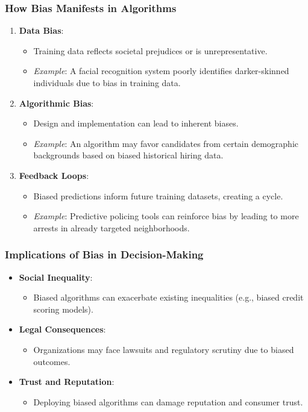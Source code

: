 \documentclass[aspectratio=169]{beamer}
\begin{document}
\begin{frame}[fragile]
    \frametitle{How Bias Manifests in Algorithms}
    \begin{enumerate}
        \item \textbf{Data Bias}:
        \begin{itemize}
            \item Training data reflects societal prejudices or is unrepresentative.
            \item \textit{Example}: A facial recognition system poorly identifies darker-skinned individuals due to bias in training data.
        \end{itemize}

        \item \textbf{Algorithmic Bias}:
        \begin{itemize}
            \item Design and implementation can lead to inherent biases.
            \item \textit{Example}: An algorithm may favor candidates from certain demographic backgrounds based on biased historical hiring data.
        \end{itemize}

        \item \textbf{Feedback Loops}:
        \begin{itemize}
            \item Biased predictions inform future training datasets, creating a cycle.
            \item \textit{Example}: Predictive policing tools can reinforce bias by leading to more arrests in already targeted neighborhoods.
        \end{itemize}
    \end{enumerate}
\end{frame}

\begin{frame}[fragile]
    \frametitle{Implications of Bias in Decision-Making}
    \begin{itemize}
        \item \textbf{Social Inequality}:
        \begin{itemize}
            \item Biased algorithms can exacerbate existing inequalities (e.g., biased credit scoring models).
        \end{itemize}

        \item \textbf{Legal Consequences}:
        \begin{itemize}
            \item Organizations may face lawsuits and regulatory scrutiny due to biased outcomes.
        \end{itemize}

        \item \textbf{Trust and Reputation}:
        \begin{itemize}
            \item Deploying biased algorithms can damage reputation and consumer trust.
        \end{itemize}
    \end{itemize}
\end{frame}
\end{document}
